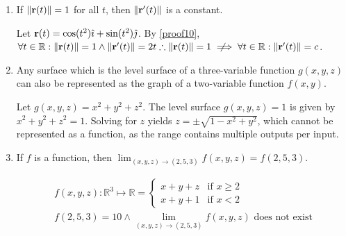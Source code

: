 \documentclass[11pt]{article}
\newcommand{\nimplies}{\mathrel{{\ooalign{\hidewidth$\not\phantom{=}$\hidewidth\cr$\implies$}}}}
\renewcommand{\vec}[1]{\ensuremath\mathbf{#1}}
\begin{document}
\begin{enumerate}
\item If \(\lVert \vec{r}(t) \rVert = 1\) for all \(t\), then \(\lVert
  \vec{r}'(t) \rVert\) is a constant.

  Let \(\vec{r}(t) = \cos(t^2)\hat{\imath} + \sin(t^2)\hat{\jmath}\). By
  \cref{proof10}, \(\forall t \in \mathbb{R} : \lVert \vec{r}(t) \rVert = 1
  \land \lVert \vec{r}'(t) \rVert = 2t \therefore \lVert \vec{r}(t) \rVert =
  1 \nimplies \forall t \in \mathbb{R} : \lVert \vec{r}'(t) \rVert = c\).

\item Any surface which is the level surface of a three-variable function
  \(g(x, y, z)\) can also be represented as the graph of a two-variable
  function \(f(x, y)\).

  Let \(g(x, y, z) = x^2 + y^2 + z^2\). The level surface \(g(x, y, z) =
  1\) is given by \(x^2 + y^2 + z^2 = 1\). Solving for \(z\) yields \(z =
  \pm \sqrt{1 - x^2 + y^2}\), which cannot be represented as a function,
  as the range contains multiple outputs per input.

\item If \(f\) is a function, then \(\lim_{(x, y, z) \to (2, 5, 3)}
  f(x, y, z) = f(2, 5, 3)\).

  \begin{equation*}
    \begin{gathered}
      f(x, y, z) : \mathbb{R}^3 \mapsto \mathbb{R} =
      \begin{cases}
        x + y + z & \text{if } x \geq 2 \\
        x + y + 1 & \text{if } x < 2
      \end{cases} \\
      f(2, 5, 3) = 10 \land \lim_{(x, y, z) \to (2, 5, 3)} f(x, y, z)
      \text{ does not exist}
    \end{gathered}
  \end{equation*}
\end{enumerate}
\end{document}
